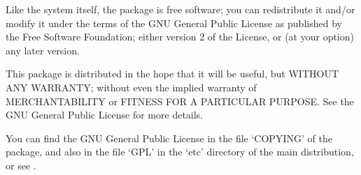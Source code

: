 Like the {\GAP} system itself, the {\FGA} package is free software;
you can redistribute it and/or modify it under the terms of the GNU
General Public License as published by the Free Software Foundation;
either version 2 of the License, or (at your option) any later
version.

This package is distributed in the hope that it will be useful, but
WITHOUT ANY WARRANTY; without even the implied warranty of
MERCHANTABILITY or FITNESS FOR A PARTICULAR PURPOSE.  See the GNU
General Public License for more details.

You can find the GNU General Public License in the file `COPYING' of
the {\FGA} package, and also in the file `GPL' in the `etc' directory
of the main {\GAP} distribution, or see
.

